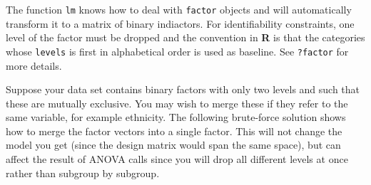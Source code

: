 \documentclass[]{book}
\newenvironment{Shaded}{\begin{snugshade}}{\end{snugshade}}
\newcommand{\CommentTok}[1]{\textcolor[rgb]{0.56,0.35,0.01}{\textit{#1}}}
\newcommand{\DataTypeTok}[1]{\textcolor[rgb]{0.13,0.29,0.53}{#1}}
\newcommand{\DecValTok}[1]{\textcolor[rgb]{0.00,0.00,0.81}{#1}}
\newcommand{\FloatTok}[1]{\textcolor[rgb]{0.00,0.00,0.81}{#1}}
\newcommand{\KeywordTok}[1]{\textcolor[rgb]{0.13,0.29,0.53}{\textbf{#1}}}
\newcommand{\NormalTok}[1]{#1}
\newcommand{\OperatorTok}[1]{\textcolor[rgb]{0.81,0.36,0.00}{\textbf{#1}}}
\newcommand{\StringTok}[1]{\textcolor[rgb]{0.31,0.60,0.02}{#1}}
\theoremstyle{definition}
\theoremstyle{definition}
\theoremstyle{definition}
\theoremstyle{remark}
\begin{document}
The function \texttt{lm} knows how to deal with \texttt{factor} objects and will automatically transform it to a matrix of binary indiactors. For identifiability constraints, one level of the factor must be dropped and the convention in \textbf{R} is that the categories whose \texttt{levels} is first in alphabetical order is used as baseline. See \texttt{?factor} for more details.

Suppose your data set contains binary factors with only two levels and such that these are mutually exclusive. You may wish to merge these if they refer to the same variable, for example ethnicity.
The following brute-force solution shows how to merge the factor vectors into a single factor. This will not change the model you get (since the design matrix would span the same space), but can affect the result of ANOVA calls since you will drop all different levels at once rather than subgroup by subgroup.

\begin{Shaded}
\end{Shaded}
\end{document}
